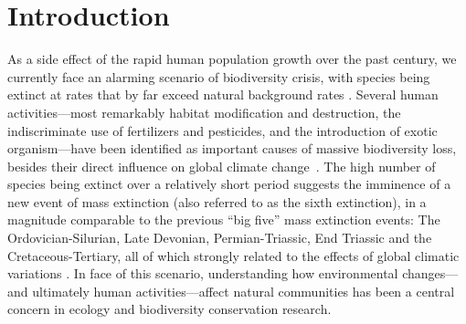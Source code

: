 \chapter{Introduction}\label{introduction}

As a side effect of the rapid human population growth over the past century, we currently face an alarming scenario of biodiversity crisis, with species being extinct at rates that by far exceed natural background rates \cite{Ceballos2015}.
Several human activities---most remarkably habitat modification and destruction, the indiscriminate use of fertilizers and pesticides, and the introduction of exotic organism---have been identified as important causes of massive biodiversity loss, besides their direct influence on global climate change~\cite{Wilcove1998}.
The high number of species being extinct over a relatively short period suggests the imminence of a new event of mass extinction (also referred to as the sixth extinction), in a magnitude comparable to the previous ``big five'' mass extinction events: The Ordovician-Silurian, Late Devonian, Permian-Triassic, End Triassic and the Cretaceous-Tertiary, all of which strongly related to the effects of global climatic variations \cite{Wake2008}.
In face of this scenario, understanding how environmental changes---and ultimately human activities---affect natural communities has been a central concern in ecology and biodiversity conservation research.


